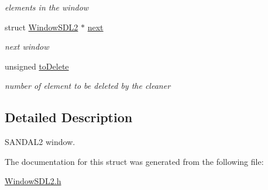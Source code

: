 \begin{DoxyCompactItemize}
\begin{DoxyCompactList}\small\item\em elements in the window \end{DoxyCompactList}\item 
struct \hyperlink{structWindowSDL2}{Window\+S\+D\+L2} $\ast$ \hyperlink{structWindowSDL2_a9f377dedae284ebaedb2d4c4702737ea}{next}\hypertarget{structWindowSDL2_a9f377dedae284ebaedb2d4c4702737ea}{}\label{structWindowSDL2_a9f377dedae284ebaedb2d4c4702737ea}

\begin{DoxyCompactList}\small\item\em next window \end{DoxyCompactList}\item 
unsigned \hyperlink{structWindowSDL2_a83f3e9f38d1171818525f22fc7b32080}{to\+Delete}\hypertarget{structWindowSDL2_a83f3e9f38d1171818525f22fc7b32080}{}\label{structWindowSDL2_a83f3e9f38d1171818525f22fc7b32080}

\begin{DoxyCompactList}\small\item\em number of element to be deleted by the cleaner \end{DoxyCompactList}\end{DoxyCompactItemize}


\subsection{Detailed Description}
S\+A\+N\+D\+A\+L2 window. 

The documentation for this struct was generated from the following file\+:\begin{DoxyCompactItemize}
\item 
\hyperlink{WindowSDL2_8h}{Window\+S\+D\+L2.\+h}\end{DoxyCompactItemize}
